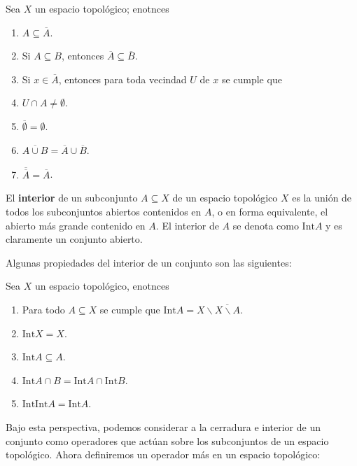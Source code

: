 \documentclass[12pt]{report}
\theoremstyle{largebreak}
\renewcommand{\theenumi}{\arabic{enumi})}
\newcommand{\Int}[1]{\text{Int}\ensuremath{#1}}
\begin{document}
    \begin{propo}
        Sea $X$ un espacio topológico; enotnces
        \renewcommand{\theenumi}{\arabic{enumi})}
        \begin{enumerate}
            \item $A\subseteq \overline{A}$.
            \item Si $A\subseteq B$, entonces $\overline{A}\subseteq\overline{B}$.
            \item Si $x\in\overline{A}$, entonces para toda vecindad $U$ de $x$ se cumple que
            \item $U\cap A\neq\emptyset$.
            \item $\overline{\emptyset}=\emptyset$.
            \item $\overline{A\cup B}=\overline{A}\cup\overline{B}$.
            \item $\overline{\overline{A}}=\overline{A}$.
        \end{enumerate}
    \end{propo}

    \begin{mydef}
        El \textbf{interior} de un subconjunto $A\subseteq X$ de un espacio topológico $X$ es la unión de todos los subconjuntos abiertos contenidos en $A$, o en forma equivalente, el abierto más grande contenido en $A$. El interior de $A$ se denota como $\Int{A}$ y es claramente un conjunto abierto.
    \end{mydef}

    Algunas propiedades del interior de un conjunto son las siguientes:

    \begin{propo}
        Sea $X$ un espacio topológico, enotnces
        \begin{enumerate}
            \item Para todo $A\subseteq X$ se cumple que $\Int{A}=X\backslash\overline{X\backslash A}$.
            \item $\Int{X}=X$.
            \item $\Int{A}\subseteq A$.
            \item $\Int{A\cap B}=\Int{A}\cap\Int{B}$.
            \item $\Int{\Int{A}}=\Int{A}$.
        \end{enumerate}
    \end{propo}

    Bajo esta perspectiva, podemos considerar a la cerradura e interior de un conjunto como operadores que actúan sobre los subconjuntos de un espacio topológico. Ahora definiremos un operador más en un espacio topológico:
\end{document}
